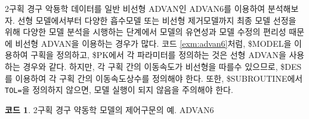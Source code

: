 \documentclass[
  11pt,
  krantz2,
  a4paper]{krantz}
\theoremstyle{definition}
\theoremstyle{definition}
\newtheorem{example}{코드}[chapter]
\theoremstyle{definition}
\theoremstyle{remark}
\begin{document}
2구획 경구 악둉학 데이터를 일반 비선형 ADVAN인 ADVAN6를 이용하여 분석해보자. 선형 모델에서부터 다양한 흡수모델 또는 비선형 제거모델까지 최종 모델 선정을 위해 다양한 모델 분석을 시행하는 단계에서 모델의 유연성과 모델 수정의 편리성 때문에 비선형 ADVAN을 이용하는 경우가 많다. 코드 \ref{exm:advan6}처럼, \$MODEL을 이용하여 구획을 정의하고, \$PK에서 각 파라미터를 정의하는 것은 선형 ADVAN을 사용하는 경우와 같다. 하지만, 각 구획 간의 이동속도가 비선형을 따를수 있으므로, \$DES를 이용하여 각 구획 간의 이동속도상수를 정의해야 한다. 또한, \$SUBROUTINE에서 \texttt{TOL=}을 정의하지 않으면, 모델 실행이 되지 않음을 주의해야 한다.

\begin{example}
\protect\hypertarget{exm:advan6}{}{\label{exm:advan6} }2구획 경구 약동학 모델의 제어구문의 예. ADVAN6
\end{example}
\end{document}
